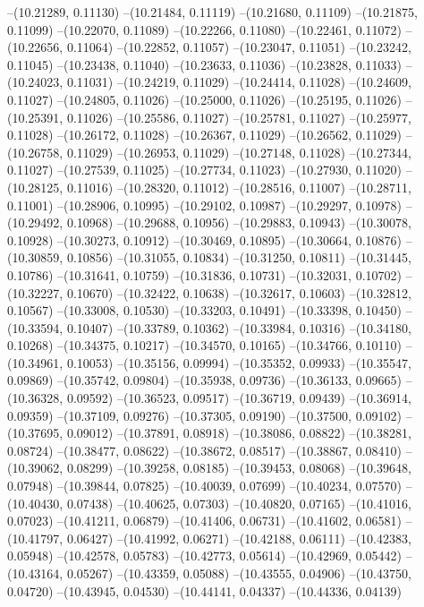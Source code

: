 --(10.21289, 0.11130)
--(10.21484, 0.11119)
--(10.21680, 0.11109)
--(10.21875, 0.11099)
--(10.22070, 0.11089)
--(10.22266, 0.11080)
--(10.22461, 0.11072)
--(10.22656, 0.11064)
--(10.22852, 0.11057)
--(10.23047, 0.11051)
--(10.23242, 0.11045)
--(10.23438, 0.11040)
--(10.23633, 0.11036)
--(10.23828, 0.11033)
--(10.24023, 0.11031)
--(10.24219, 0.11029)
--(10.24414, 0.11028)
--(10.24609, 0.11027)
--(10.24805, 0.11026)
--(10.25000, 0.11026)
--(10.25195, 0.11026)
--(10.25391, 0.11026)
--(10.25586, 0.11027)
--(10.25781, 0.11027)
--(10.25977, 0.11028)
--(10.26172, 0.11028)
--(10.26367, 0.11029)
--(10.26562, 0.11029)
--(10.26758, 0.11029)
--(10.26953, 0.11029)
--(10.27148, 0.11028)
--(10.27344, 0.11027)
--(10.27539, 0.11025)
--(10.27734, 0.11023)
--(10.27930, 0.11020)
--(10.28125, 0.11016)
--(10.28320, 0.11012)
--(10.28516, 0.11007)
--(10.28711, 0.11001)
--(10.28906, 0.10995)
--(10.29102, 0.10987)
--(10.29297, 0.10978)
--(10.29492, 0.10968)
--(10.29688, 0.10956)
--(10.29883, 0.10943)
--(10.30078, 0.10928)
--(10.30273, 0.10912)
--(10.30469, 0.10895)
--(10.30664, 0.10876)
--(10.30859, 0.10856)
--(10.31055, 0.10834)
--(10.31250, 0.10811)
--(10.31445, 0.10786)
--(10.31641, 0.10759)
--(10.31836, 0.10731)
--(10.32031, 0.10702)
--(10.32227, 0.10670)
--(10.32422, 0.10638)
--(10.32617, 0.10603)
--(10.32812, 0.10567)
--(10.33008, 0.10530)
--(10.33203, 0.10491)
--(10.33398, 0.10450)
--(10.33594, 0.10407)
--(10.33789, 0.10362)
--(10.33984, 0.10316)
--(10.34180, 0.10268)
--(10.34375, 0.10217)
--(10.34570, 0.10165)
--(10.34766, 0.10110)
--(10.34961, 0.10053)
--(10.35156, 0.09994)
--(10.35352, 0.09933)
--(10.35547, 0.09869)
--(10.35742, 0.09804)
--(10.35938, 0.09736)
--(10.36133, 0.09665)
--(10.36328, 0.09592)
--(10.36523, 0.09517)
--(10.36719, 0.09439)
--(10.36914, 0.09359)
--(10.37109, 0.09276)
--(10.37305, 0.09190)
--(10.37500, 0.09102)
--(10.37695, 0.09012)
--(10.37891, 0.08918)
--(10.38086, 0.08822)
--(10.38281, 0.08724)
--(10.38477, 0.08622)
--(10.38672, 0.08517)
--(10.38867, 0.08410)
--(10.39062, 0.08299)
--(10.39258, 0.08185)
--(10.39453, 0.08068)
--(10.39648, 0.07948)
--(10.39844, 0.07825)
--(10.40039, 0.07699)
--(10.40234, 0.07570)
--(10.40430, 0.07438)
--(10.40625, 0.07303)
--(10.40820, 0.07165)
--(10.41016, 0.07023)
--(10.41211, 0.06879)
--(10.41406, 0.06731)
--(10.41602, 0.06581)
--(10.41797, 0.06427)
--(10.41992, 0.06271)
--(10.42188, 0.06111)
--(10.42383, 0.05948)
--(10.42578, 0.05783)
--(10.42773, 0.05614)
--(10.42969, 0.05442)
--(10.43164, 0.05267)
--(10.43359, 0.05088)
--(10.43555, 0.04906)
--(10.43750, 0.04720)
--(10.43945, 0.04530)
--(10.44141, 0.04337)
--(10.44336, 0.04139)
